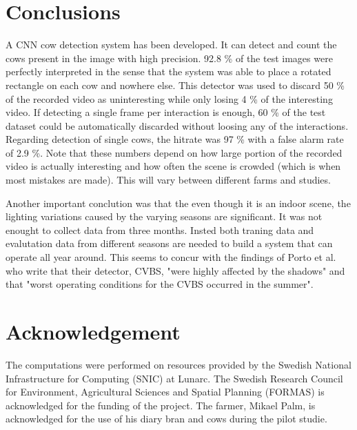 \documentclass{cta-author}
\begin{document}
\section{Conclusions}
A CNN cow detection system has been developed. It can detect and count the cows present in the image with 
high precision. 92.8 \% of the test images were perfectly interpreted in the sense that the system was able 
to place a rotated rectangle on each cow and nowhere else. This detector was used to discard 50 \% of the 
recorded video as uninteresting while only losing 4 \% of the interesting video. If detecting a single frame 
per interaction is enough, 60 \% of the test dataset could be automatically discarded without loosing any of the 
interactions. Regarding detection of single cows, the hitrate was 97 \% with a false alarm rate of 2.9 \%. 
Note that these numbers depend on how large portion of the recorded video is actually interesting and how 
often the scene is crowded (which is when most mistakes are made). This will vary between different farms and 
studies.

Another important conclution was that the even though it is an indoor scene, the lighting variations caused 
by the varying seasons are significant. It was not enought to collect data from three months. Insted both 
traning data and evalutation data from different seasons are needed to build a system that can operate all 
year around. This seems to concur with the findings of Porto et al. \cite{porto2015automatic} who write that 
their detector, CVBS, 
"were highly affected by the shadows" and that "worst operating
conditions for the CVBS occurred in the summer".


\section{Acknowledgement}
The computations were performed on resources provided by the Swedish National Infrastructure for Computing 
(SNIC) at Lunarc. The Swedish Research Council for Environment, Agricultural Sciences and 
Spatial Planning (FORMAS) is acknowledged 
for the funding of the project. The farmer, Mikael Palm, is acknowledged for the use of his diary bran and 
cows during the pilot studie.




{\parindent0pt
\parskip8pt

}
\end{document}
